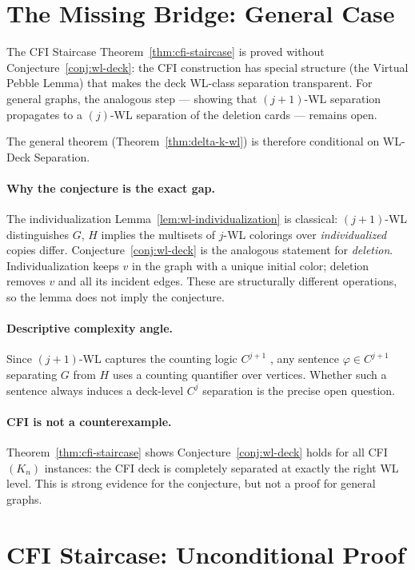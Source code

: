\documentclass[11pt,a4paper]{article}
\begin{document}
\section{The Missing Bridge: General Case}
\label{sec:gap}

The CFI Staircase Theorem~\ref{thm:cfi-staircase} is proved without Conjecture~\ref{conj:wl-deck}: the CFI construction has special structure (the Virtual Pebble Lemma) that makes the deck WL-class separation transparent. For general graphs, the analogous step — showing that $(j+1)$-WL separation propagates to a $(j)$-WL separation of the deletion cards — remains open.

The general theorem (Theorem~\ref{thm:delta-k-wl}) is therefore conditional on WL-Deck Separation.

\paragraph{Why the conjecture is the exact gap.} The individualization Lemma~\ref{lem:wl-individualization} is classical: $(j{+}1)$-WL distinguishes $G$, $H$ implies the multisets of $j$-WL colorings over \emph{individualized} copies differ. Conjecture~\ref{conj:wl-deck} is the analogous statement for \emph{deletion}. Individualization keeps $v$ in the graph with a unique initial color; deletion removes $v$ and all its incident edges. These are structurally different operations, so the lemma does not imply the conjecture.

\paragraph{Descriptive complexity angle.} Since $(j{+}1)$-WL captures the counting logic $C^{j+1}$ \cite{cai1992optimal}, any sentence $\varphi \in C^{j+1}$ separating $G$ from $H$ uses a counting quantifier over vertices. Whether such a sentence always induces a deck-level $C^j$ separation is the precise open question.

\paragraph{CFI is not a counterexample.} Theorem~\ref{thm:cfi-staircase} shows Conjecture~\ref{conj:wl-deck} holds for all CFI$(K_n)$ instances: the CFI deck is completely separated at exactly the right WL level. This is strong evidence for the conjecture, but not a proof for general graphs.

\section{CFI Staircase: Unconditional Proof}
\label{sec:cfi}
\end{document}
